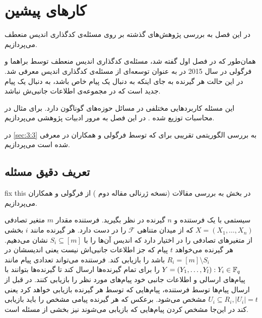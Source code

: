 \chapter{کارهای پیشین}
\label{chapter:literature}

در این فصل به بررسی پژوهش‌های گذشته بر روی مسئله‌ی کدگذاری اندیس منعطف می‌پردازیم.

همان‌طور که در فصل اول گفته شد، مسئله‌ی کدگذاری اندیس منعطف توسط براهما و فرگولی در سال 2015 در
\cite{pliablefirstpaper}
به عنوان توسعه‌ای از مسئله‌ی کدگذاری اندیس معرفی شد. در این حالت هر گیرنده به جای اینکه به دنبال یک پیام خاص باشد، به دنبال یک پیام جدید است که در مجموعه‌ی اطلاعات جانبی‌ش نباشد.

این مسئله کاربردهایی مختلفی در مسائل حوزه‌های گوناگون دارد. برای مثال در محاسبات توزیع شده
\cite{datashuf}
\cite{8404065}
\cite{8682270}.
در این فصل به مرور ادبیات پژوهشی 
\picod
می‌پردازیم.

در 
\autoref{sec:3:3}
به بررسی الگوریتمی تقریبی برای 
\picod
که توسط فرگولی و همکاران در
\cite{song2017polynomialtime}
معرفی شده است می‌پردازیم.
\section{تعریف دقیق مسئله}
\label{sec:3:3}
fix this
در بخش به بررسی مقالات
\cite{pliablefirstpaper,6620405, pliable2015paper,  song2017polynomialtime}
(نسخه ژرنالی مقاله دوم
\cite{7541273}
) از فرگولی و همکاران می‌پردازیم. 

	سیستمی با یک فرستنده و 
	$n$
	گیرنده در نظر بگیرید. فرستنده مقدار
	$m$
	متغیر تصادفی
	$X = (X_1, \ldots, X_n)$
	که از میدان متناهی
	$\mathcal{F}$
	را در دست دارد. هر گیرنده مانند 
	$i$
	بخشی از متغیرهای تصادفی را در اختیار دارد که اندیس آن‌ها را با 
	$S_i \subseteq [m]$
	نشان می‌دهیم. هر گیرنده می‌خواهد 
	$t$
	پیام که جز اطلاعات جانبی‌اش نیست یعنی اندیسشان در
	$R_i = [m] \setminus S_i$
	باشد را بازیابی کند.
	فرستنده می‌تواند تعدادی پیام مانند
	$Y = (Y_1, \ldots, Y_l): Y_i \in {\mathbb{F}_q}$
	را برای تمام گیرنده‌ها ارسال کند تا گیرنده‌ها بتوانند با پیام‌های ارسالی و اطلاعات جانبی خود پیام‌های مورد نظر را بازیابی کنند. در
	\picod
	قبل از ارسال پیام‌ها توسط فرستنده، پیام‌هایی که توسط هر گیرنده بازیابی خواهد کرد یعنی
	$U_i \subseteq R_i,  |U_i| = t$
	 مشخص می‌شود. برعکس 
	\icod
	 که هر گیرنده پیامی مشخص را باید بازیابی کند در این‌جا مشخص کردن پیام‌هایی که بازیابی می‌شوند نیز بخشی از مسئله است.
	 
